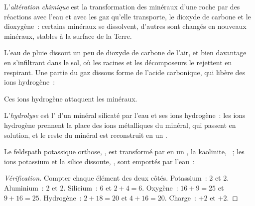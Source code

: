\begin{definition}\label{def:g10:soil-formation:chemical-weathering}
L'\emph{altération chimique}
est la transformation des minéraux d'une roche par des réactions avec l'eau
et avec les gaz qu'elle transporte, le dioxyde de carbone et le
dioxygène~: certains minéraux se dissolvent, d'autres sont changés en
nouveaux minéraux, stables à la surface de la Terre.
\end{definition}

L'eau de pluie dissout un peu de dioxyde de carbone de l'air, et bien
davantage en s'infiltrant dans le sol, où les racines et les décomposeurs
le rejettent en respirant. Une partie du gaz dissous forme de l'acide
carbonique, qui libère des ions hydrogène~:
\begin{center}
\end{center}
Ces ions hydrogène attaquent les minéraux.

\begin{definition}[Hydrolyse]\label{def:g10:soil-formation:hydrolysis}
L'\emph{hydrolyse} est l' d'un minéral
silicaté par l'eau et ses ions hydrogène~: les ions hydrogène prennent la
place des ions métalliques du minéral, qui passent en solution, et le reste
du minéral est reconstruit en un .
\end{definition}

\begin{proposition}\label{prop:g10:soil-formation:hydrolysis}
Le feldspath potassique orthose, , est transformé par
 en un , la kaolinite, ~; les
ions potassium et la silice dissoute, , sont emportés par
l'eau~:
\begin{center}
\end{center}
\end{proposition}

\begin{proof}[Vérification]
Compter chaque élément des deux côtés. Potassium~: 2 et 2. Aluminium~: 2
et 2. Silicium~: 6 et $2 + 4 = 6$. Oxygène~: $16 + 9 = 25$ et $9 + 16 = 25$.
Hydrogène~: $2 + 18 = 20$ et $4 + 16 = 20$. Charge~: $+2$ et $+2$.
\end{proof}

